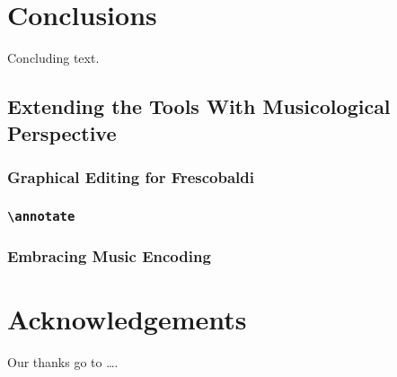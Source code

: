 \documentclass[11pt,a4paper]{article}
\begin{document}
\section{Conclusions}\label{sec:conclusions}

Concluding text.


\subsection{Extending the Tools With Musicological Perspective}

\subsubsection{Graphical Editing for Frescobaldi}

\subsubsection{\texttt{\textbackslash annotate}}

\subsubsection{Embracing Music Encoding}



\section{Acknowledgements}

Our thanks go to \ldots .
\end{document}
